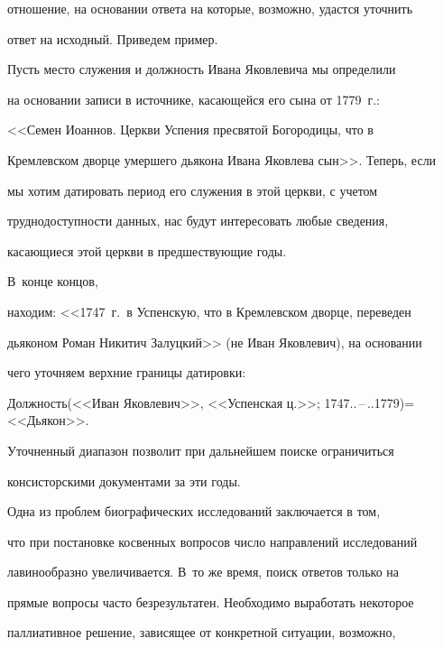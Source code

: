 отношение, на основании ответа на которые, возможно, удастся уточнить 


ответ на исходный. Приведем пример. 


%     


     Пусть место служения и должность Ивана Яковлевича мы определили 


на основании записи в источнике, касающейся его сына от 1779~г.: 


<<Семен Иоаннов. Церкви Успения пресвятой Богородицы, что в 


Кремлевском дворце умершего дьякона Ивана Яковлева сын>>. Теперь, если 


мы хотим датировать период его служения в этой церкви,  с учетом 


труднодоступности данных, нас будут интересовать любые сведения, 


касающиеся этой церкви в предшествующие \mbox{годы}.  


В~конце концов, 


находим: <<1747~г.\ в Успенскую, что в Кремлевском дворце,  переведен 


дьяконом Роман Никитич Залуцкий>>  (не Иван Яковлевич), на основании 


чего уточняем верхние границы датировки:


\begin{center}


Должность(<<Иван Яковлевич>>, <<Успенская ц.>>; 1747..\,--\,..1779)\;=\;<<Дьякон>>.


\end{center}


     


     Уточненный диапазон позволит при дальнейшем поиске ограничиться 


консисторскими документами за эти годы.


     


     Одна из проблем биографических исследований  заключается в том, 


что при постановке косвенных вопросов число направлений исследований 


лавинообразно увеличивается. В~то же время, поиск ответов только на 


прямые вопросы час\-то безрезультатен. Необходимо выработать некоторое 


паллиативное решение, зависящее от конкретной ситуации, возможно, 


